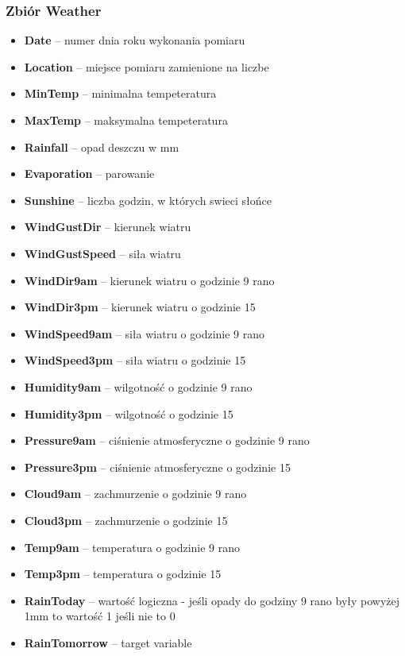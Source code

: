 \documentclass{classrep}
\begin{document}
{{                \subsubsection{Zbiór Weather}
                \label{opis_zbiorow_intro_weather} {
                    \begin{itemize}
                        \item \textbf{Date} -- numer dnia roku wykonania pomiaru
                        \item \textbf{Location} -- miejsce pomiaru zamienione na liczbe
                        \item \textbf{MinTemp} -- minimalna tempeteratura
                        \item \textbf{MaxTemp} -- maksymalna tempeteratura
                        \item \textbf{Rainfall} -- opad deszczu w mm
                        \item \textbf{Evaporation} -- parowanie
                        \item \textbf{Sunshine} -- liczba godzin, w których swieci słońce
                        \item \textbf{WindGustDir} -- kierunek wiatru
                        \item \textbf{WindGustSpeed} -- siła wiatru
                        \item \textbf{WindDir9am} -- kierunek wiatru o godzinie 9 rano
                        \item \textbf{WindDir3pm} -- kierunek wiatru o godzinie 15
                        \item \textbf{WindSpeed9am} -- siła wiatru o godzinie 9 rano
                        \item \textbf{WindSpeed3pm} -- siła wiatru o godzinie 15
                        \item \textbf{Humidity9am} -- wilgotność o godzinie 9 rano
                        \item \textbf{Humidity3pm} -- wilgotność o godzinie 15
                        \item \textbf{Pressure9am} -- ciśnienie atmosferyczne o godzinie 9 rano
                        \item \textbf{Pressure3pm} -- ciśnienie atmosferyczne o godzinie 15
                        \item \textbf{Cloud9am} -- zachmurzenie o godzinie 9 rano
                        \item \textbf{Cloud3pm} -- zachmurzenie o godzinie 15
                        \item \textbf{Temp9am} -- temperatura o godzinie 9 rano
                        \item \textbf{Temp3pm} -- temperatura o godzinie 15
                        \item \textbf{RainToday} -- wartość logiczna - jeśli opady do godziny 9
                        rano były powyżej 1mm to wartość 1 jeśli nie to 0
                        \item \textbf{RainTomorrow} -- target variable 
                    \end{itemize}
                 }
        }

}
\end{document}
